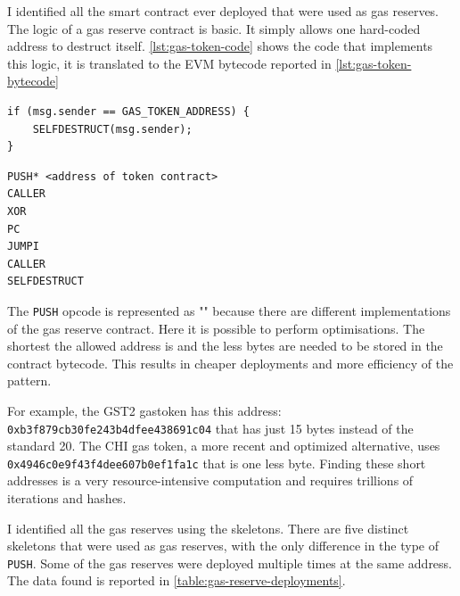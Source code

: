I identified all the smart contract ever deployed that were used as gas reserves. The logic of a gas reserve contract is basic. It simply allows one hard-coded address to destruct itself. \cref{lst:gas-token-code} shows the code that implements this logic, it is translated to the EVM bytecode reported in \cref{lst:gas-token-bytecode}

\begin{lstlisting}[caption={Pseudo code of the gas reserves.},label={lst:gas-token-code},captionpos=b,numbers=none]
if (msg.sender == GAS_TOKEN_ADDRESS) {
    SELFDESTRUCT(msg.sender);
}
\end{lstlisting}

\begin{lstlisting}[caption={EVM bytecode of the gas reserves.},label={lst:gas-token-bytecode},captionpos=b,numbers=none]
PUSH* <address of token contract>
CALLER
XOR
PC
JUMPI
CALLER
SELFDESTRUCT
\end{lstlisting}

The {\tt PUSH} opcode is represented as "{\tt *}" because there are different implementations of the gas reserve contract. Here it is possible to perform optimisations. The shortest the allowed address is and the less bytes are needed to be stored in the contract bytecode. This results in cheaper deployments and more efficiency of the pattern.

For example, the GST2 gastoken has this address: \\{\tt 0xb3f879cb30fe243b4dfee438691c04} that has just 15 bytes instead of the standard 20. The CHI gas token, a more recent and optimized alternative, uses\\ {\tt 0x4946c0e9f43f4dee607b0ef1fa1c} that is one less byte. Finding these short addresses is a very resource-intensive computation and requires trillions of iterations and hashes.

I identified all the gas reserves using the skeletons. There are five distinct skeletons that were used as gas reserves, with the only difference in the type of {\tt PUSH}. Some of the gas reserves were deployed multiple times at the same address. The data found is reported in \cref{table:gas-reserve-deployments}.

